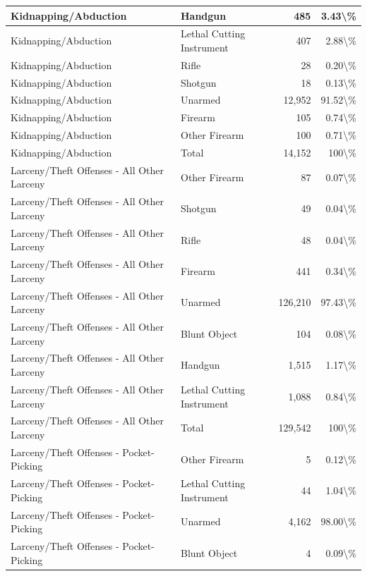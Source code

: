 \documentclass[
]{krantz}
\begin{document}
\begin{longtable}[t]{l|l|r|r}
\hline
Kidnapping/Abduction & Handgun & 485 & 3.43\textbackslash{}\%\\
\hline
Kidnapping/Abduction & Lethal Cutting Instrument & 407 & 2.88\textbackslash{}\%\\
\hline
Kidnapping/Abduction & Rifle & 28 & 0.20\textbackslash{}\%\\
\hline
Kidnapping/Abduction & Shotgun & 18 & 0.13\textbackslash{}\%\\
\hline
Kidnapping/Abduction & Unarmed & 12,952 & 91.52\textbackslash{}\%\\
\hline
Kidnapping/Abduction & Firearm & 105 & 0.74\textbackslash{}\%\\
\hline
Kidnapping/Abduction & Other Firearm & 100 & 0.71\textbackslash{}\%\\
\hline
Kidnapping/Abduction & Total & 14,152 & 100\textbackslash{}\%\\
\hline
Larceny/Theft Offenses - All Other Larceny & Other Firearm & 87 & 0.07\textbackslash{}\%\\
\hline
Larceny/Theft Offenses - All Other Larceny & Shotgun & 49 & 0.04\textbackslash{}\%\\
\hline
Larceny/Theft Offenses - All Other Larceny & Rifle & 48 & 0.04\textbackslash{}\%\\
\hline
Larceny/Theft Offenses - All Other Larceny & Firearm & 441 & 0.34\textbackslash{}\%\\
\hline
Larceny/Theft Offenses - All Other Larceny & Unarmed & 126,210 & 97.43\textbackslash{}\%\\
\hline
Larceny/Theft Offenses - All Other Larceny & Blunt Object & 104 & 0.08\textbackslash{}\%\\
\hline
Larceny/Theft Offenses - All Other Larceny & Handgun & 1,515 & 1.17\textbackslash{}\%\\
\hline
Larceny/Theft Offenses - All Other Larceny & Lethal Cutting Instrument & 1,088 & 0.84\textbackslash{}\%\\
\hline
Larceny/Theft Offenses - All Other Larceny & Total & 129,542 & 100\textbackslash{}\%\\
\hline
Larceny/Theft Offenses - Pocket-Picking & Other Firearm & 5 & 0.12\textbackslash{}\%\\
\hline
Larceny/Theft Offenses - Pocket-Picking & Lethal Cutting Instrument & 44 & 1.04\textbackslash{}\%\\
\hline
Larceny/Theft Offenses - Pocket-Picking & Unarmed & 4,162 & 98.00\textbackslash{}\%\\
\hline
Larceny/Theft Offenses - Pocket-Picking & Blunt Object & 4 & 0.09\textbackslash{}\%\\

\end{longtable}
\end{document}
